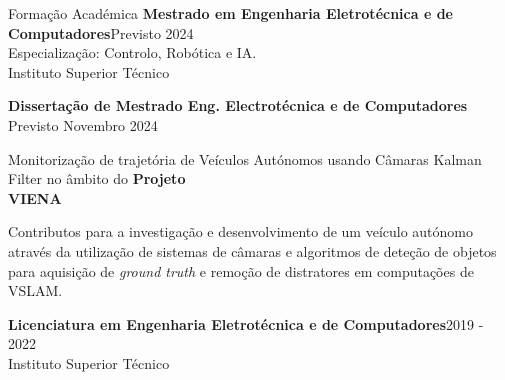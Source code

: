 \documentclass[14pt]{resume} %
\begin{document}
\vspace{0.5cm}
\begin{rSection}{Formação Académica}
\vspace{1ex}
{\bf Mestrado em Engenharia Eletrotécnica e de Computadores}\hfill {Previsto 2024}\\
Especialização: Controlo, Robótica e IA.\\
Instituto Superior Técnico


\vspace{2ex}

{\bf Dissertação de Mestrado Eng. Electrotécnica e de Computadores} \hfill Previsto Novembro 2024

Monitorização de trajetória de Veículos Autónomos usando Câmaras Kalman Filter no âmbito do \textbf{Projeto \\VIENA}


Contributos para a investigação e desenvolvimento de um veículo autónomo através da utilização de sistemas de câmaras e algoritmos de deteção de objetos para aquisição de \textit{ground truth} e remoção de distratores em computações de VSLAM. 

\vspace{2ex}

{\bf Licenciatura em Engenharia Eletrotécnica e de Computadores}\hfill {2019 - 2022}\\
Instituto Superior Técnico 
\end{rSection}
\end{document}
